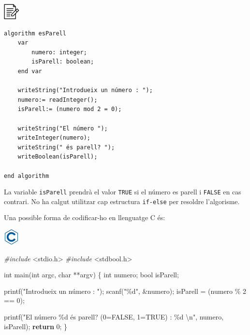 \documentclass[
]{book}
\newenvironment{Shaded}{\begin{snugshade}}{\end{snugshade}}
\newcommand{\ControlFlowTok}[1]{\textcolor[rgb]{0.13,0.29,0.53}{\textbf{#1}}}
\newcommand{\DataTypeTok}[1]{\textcolor[rgb]{0.13,0.29,0.53}{#1}}
\newcommand{\DecValTok}[1]{\textcolor[rgb]{0.00,0.00,0.81}{#1}}
\newcommand{\ImportTok}[1]{#1}
\newcommand{\NormalTok}[1]{#1}
\newcommand{\PreprocessorTok}[1]{\textcolor[rgb]{0.56,0.35,0.01}{\textit{#1}}}
\newcommand{\SpecialCharTok}[1]{\textcolor[rgb]{0.00,0.00,0.00}{#1}}
\newcommand{\StringTok}[1]{\textcolor[rgb]{0.31,0.60,0.02}{#1}}
\begin{document}
\includegraphics{./img/alg.png}

\begin{verbatim}
algorithm esParell
    var
        numero: integer;
        isParell: boolean;
    end var

    writeString("Introdueix un número : ");
    numero:= readInteger();
    isParell:= (numero mod 2 = 0);
    
    writeString("El número ");
    writeInteger(numero);
    writeString(" és parell? ");
    writeBoolean(isParell);

end algorithm
\end{verbatim}

La variable \texttt{isParell} prendrà el valor \texttt{TRUE} si el número es parell i \texttt{FALSE} en cas contrari. No ha calgut utilitzar cap estructura \texttt{if-else} per resoldre l'algorisme.

Una possible forma de codificar-ho en llenguatge C és:

\includegraphics{./img/c.png}

\begin{Shaded}
\begin{Highlighting}[]
\PreprocessorTok{\#include }\ImportTok{\textless{}stdio.h\textgreater{}}
\PreprocessorTok{\#include }\ImportTok{\textless{}stdbool.h\textgreater{}}

\DataTypeTok{int}\NormalTok{ main(}\DataTypeTok{int}\NormalTok{ argc, }\DataTypeTok{char}\NormalTok{ **argv) \{}
    \DataTypeTok{int}\NormalTok{ numero;}
    \DataTypeTok{bool}\NormalTok{ isParell;}

\NormalTok{    printf(}\StringTok{"Introdueix un número : "}\NormalTok{);}
\NormalTok{    scanf(}\StringTok{"\%d"}\NormalTok{, \&numero);}
\NormalTok{    isParell = (numero \% }\DecValTok{2}\NormalTok{ == }\DecValTok{0}\NormalTok{);}
    
\NormalTok{    printf(}\StringTok{"El número \%d és parell? (0=FALSE, 1=TRUE) : \%d }\SpecialCharTok{\textbackslash{}n}\StringTok{"}\NormalTok{, numero, isParell);}
    \ControlFlowTok{return} \DecValTok{0}\NormalTok{;}
\NormalTok{\}}
\end{Highlighting}
\end{Shaded}
\end{document}
